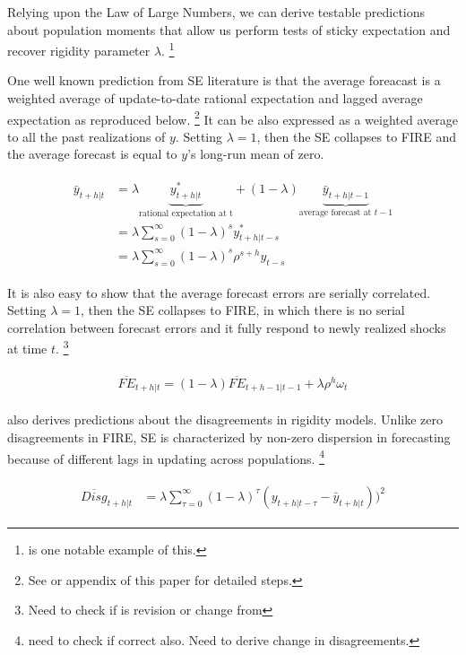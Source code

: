 \documentclass[]{article}
\begin{document}
Relying upon the Law of Large Numbers, we can derive testable predictions about population moments that allow us perform tests of sticky expectation and recover rigidity parameter $\lambda$. \footnote{\cite{carroll2003macroeconomic} is one notable example of this.} 
	

One well known prediction from SE literature is that the average foreacast is a weighted average of update-to-date rational expectation and lagged average expectation as reproduced below. \footnote{See \cite{coibion2012can} or appendix of this paper for detailed steps.} It can be also expressed as a weighted average to all the past realizations of $y$. Setting $\lambda=1$, then the SE collapses to FIRE and the average forecast is equal to $y$'s long-run mean of zero.

\begin{eqnarray}
\begin{aligned}
\bar y_{t+h|t} & = \lambda \underbrace{y^*_{t+h|t}}_{\textrm{rational expectation at t}} + (1-\lambda) \underbrace{\bar y_{t+h|t-1}}_{\textrm{average forecast at } t-1} \\
& = \lambda \sum^{\infty}_{s=0} (1-\lambda)^s y^*_{t+h|t-s} \\
& = \lambda \sum^{\infty}_{s=0} (1-\lambda)^s \rho^{s+h}y_{t-s}
\end{aligned}
\end{eqnarray}

It is also easy to show that the average forecast errors are serially correlated. Setting $\lambda=1$, then the SE collapses to FIRE, in which there is no serial correlation between forecast errors and it fully respond to newly realized shocks at time $t$.  \footnote{Need to check if is revision or change from}

\begin{eqnarray}
\begin{aligned}
\overline{FE}_{t+h|t}  = (1-\lambda) \overline {FE}_{t+h-1|t-1} + \lambda \rho^h \omega_t 
\end{aligned}
\end{eqnarray}


\cite{coibion2012can} also derives predictions about the disagreements in rigidity models. Unlike zero disagreements in FIRE, SE is characterized by non-zero dispersion in forecasting because of different lags in updating across populations. \footnote{need to check if correct also. Need to derive change in disagreements.} 

\begin{eqnarray}
\begin{aligned}
\overline{Disg}_{t+h|t} & = \lambda \sum^{\infty}_{\tau=0} (1-\lambda)^{\tau} (y_{t+h|t-\tau} - \bar y_{t+h|t }))^2  
\end{aligned}
\end{eqnarray}
\end{document}
